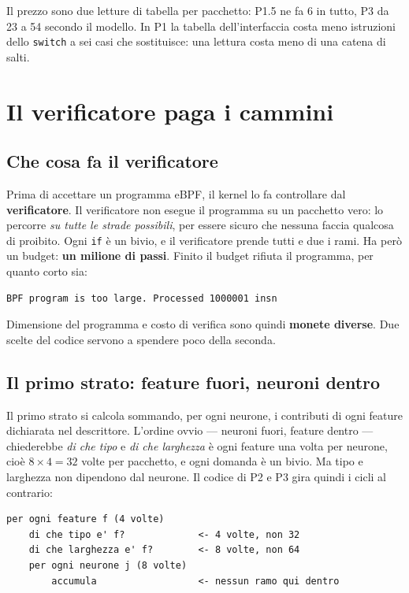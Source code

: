 \documentclass[11pt,a4paper,oneside]{report}
\begin{document}
Il prezzo sono due letture di tabella per pacchetto: P1.5 ne fa 6 in tutto, P3 da 23 a
54 secondo il modello.
In P1 la tabella dell'interfaccia costa meno istruzioni dello \texttt{switch} a
sei casi che sostituisce: una lettura costa meno di una catena di salti.

\chapter{Il verificatore paga i cammini}
\label{ch:relu}

\section{Che cosa fa il verificatore}

Prima di accettare un programma eBPF, il kernel lo fa controllare dal
\textbf{verificatore}. Il verificatore non esegue il programma su un pacchetto
vero: lo percorre \emph{su tutte le strade possibili}, per essere sicuro che
nessuna faccia qualcosa di proibito. Ogni \texttt{if} è un bivio, e il
verificatore prende tutti e due i rami. Ha però un budget: \textbf{un milione di
passi}. Finito il budget rifiuta il programma, per quanto corto sia:

\begin{lstlisting}
BPF program is too large. Processed 1000001 insn
\end{lstlisting}

Dimensione del programma e costo di verifica sono quindi \textbf{monete
diverse}. Due scelte del codice servono a spendere poco della seconda.

\section{Il primo strato: feature fuori, neuroni dentro}

Il primo strato si calcola sommando, per ogni neurone, i contributi di ogni
feature dichiarata nel descrittore. L'ordine ovvio --- neuroni fuori, feature
dentro --- chiederebbe \emph{di che tipo} e \emph{di che larghezza} è ogni
feature una volta per neurone, cioè $8 \times 4 = 32$ volte per pacchetto, e
ogni domanda è un bivio. Ma tipo e larghezza non dipendono dal neurone. Il
codice di P2 e P3 gira quindi i cicli al contrario:

\begin{lstlisting}
per ogni feature f (4 volte)
    di che tipo e' f?             <- 4 volte, non 32
    di che larghezza e' f?        <- 8 volte, non 64
    per ogni neurone j (8 volte)
        accumula                  <- nessun ramo qui dentro
\end{lstlisting}
\end{document}
